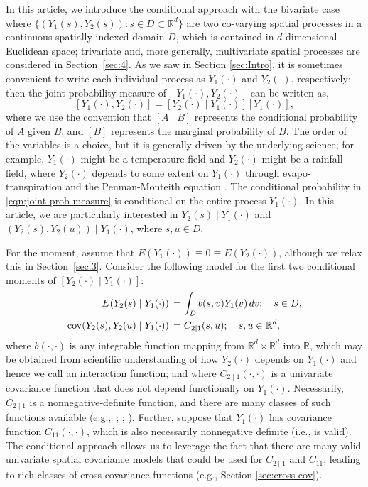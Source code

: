 \documentclass[lineno]{biometrika}
\newcommand{\svec} {s}
\newcommand{\uvec} {u}
\newcommand{\s}{s}
\renewcommand{\v}{v}
\renewcommand{\u}{u}
\renewcommand{\d}{d}
\newcommand{\E}{E}
\newcommand{\cov}{\mathrm{cov}}
\newcommand{\RR}{\mathbb{R}}
\let\originalleft\left
\let\originalright\right
\renewcommand{\left}{\mathopen{}\mathclose\bgroup\originalleft}
\renewcommand{\right}{\aftergroup\egroup\originalright}
\begin{document}
In this article, we introduce the conditional approach with the bivariate case where $\{(Y_1(\s),Y_2(\s)):\s\in D\subset \RR^d\}$ are two co-varying spatial processes in a continuous-spatially-indexed domain $D$, which is contained in $d$-dimensional Euclidean space; trivariate and, more generally, multivariate spatial processes are considered in Section~\ref{sec:4}. As we saw in Section \ref{sec:Intro}, it is sometimes convenient to write each individual process as $Y_1(\cdot)$ and $Y_2(\cdot)$, respectively; then the joint probability measure of $[Y_1(\cdot),Y_2(\cdot)]$ can be written as,
\begin{equation}\label{eqn:joint-prob-measure}
[Y_1(\cdot),Y_2(\cdot)]=[Y_2(\cdot)\mid Y_1(\cdot)][Y_1(\cdot)],
\end{equation}
where we use the convention that $[A\mid B]$ represents the conditional probability of $A$ given $B$, and $[B]$ represents the marginal probability of $B$. The order of the variables is a choice, but it is generally driven by the underlying science; for example, $Y_1(\cdot)$ might be a temperature field and $Y_2(\cdot)$ might be a rainfall field, where $Y_2(\cdot)$ depends to some extent on $Y_1(\cdot)$ through evapo-transpiration and the Penman-Monteith equation \citep[e.g.,][]{Beven1979}. The conditional probability in \eqref{eqn:joint-prob-measure} is conditional on the entire process $Y_1(\cdot)$. In this article, we are particularly interested in $Y_2(\s)\mid Y_1(\cdot)$ and $(Y_2(\s),Y_2(\u))\mid Y_1(\cdot)$, where $\svec, \uvec \in D$.

For the moment, assume that $\E(Y_1(\cdot))\equiv 0 \equiv \E(Y_2(\cdot))$, although we relax this in Section~\ref{sec:3}. Consider the following model for the first two conditional moments of $[Y_2(\cdot)\mid Y_1(\cdot)]$:
\begin{align}\label{eqn:E-and-cov}
\E\left(Y_2(\s)\mid Y_1(\cdot)\right)&\,=\int_D{b(\s,\v)Y_1(\v)\,\d \v};\quad \s\in D,\\
\cov\left(Y_2(\s),Y_2(\u)\mid Y_1(\cdot)\right)&\,=C_{2\mid 1}(\s,\u);\quad \s,\u\in \mathbb{R}^d,\nonumber
\end{align}
where $b(\cdot,\cdot)$ is any integrable function mapping from $\RR^d\times \RR^d$ into $\RR$, which may be obtained from scientific understanding of how $Y_2(\cdot)$ depends on $Y_1(\cdot)$ \citep[e.g., how wind depends on pressure gradients; see][]{Royleetal1999} and hence we call an interaction function; and where $C_{2\mid 1}(\cdot,\cdot)$ is a univariate covariance function that does not depend functionally on $Y_1(\cdot)$. Necessarily, $C_{2\mid 1}$ is a nonnegative-definite function, and there are many classes of such functions available (e.g.,~\citealp{Christakos1984}; \citealp[Section~2.5]{Cressie1993}; \citealp[Section~2.2]{Banerjeeetal2004}). Further, suppose that $Y_1(\cdot)$ has covariance function $C_{11}(\cdot,\cdot)$, which is also necessarily nonnegative definite (i.e., is valid). The conditional approach allows us to leverage the fact that there are many valid univariate spatial covariance models that could be used for $C_{2\mid 1}$ and $C_{11}$, leading to rich classes of cross-covariance functions (e.g., Section \ref{sec:cross-cov}).
\end{document}
